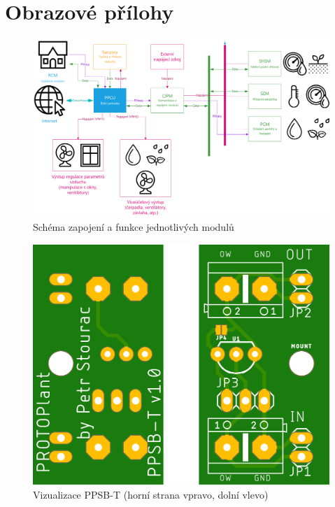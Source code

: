 \chapter{Obrazové přílohy}

\begin{figure}[htbp]
    \centering
    \includegraphics[angle=90,origin=c,scale=0.7]{img/HARDWARE/MODULES.png}
    \caption{Schéma zapojení a funkce jednotlivých modulů}
    \label{fig:add-MODULES}
 \end{figure}

 \begin{figure}[h]
    \centering
    \includegraphics[width=\textwidth]{img/HARDWARE/PPSB-T_BOTH.png}
    \caption{Vizualizace PPSB-T (horní strana vpravo, dolní vlevo)}
    \label{fig:PPSB-T_VISUAL}
\end{figure}


